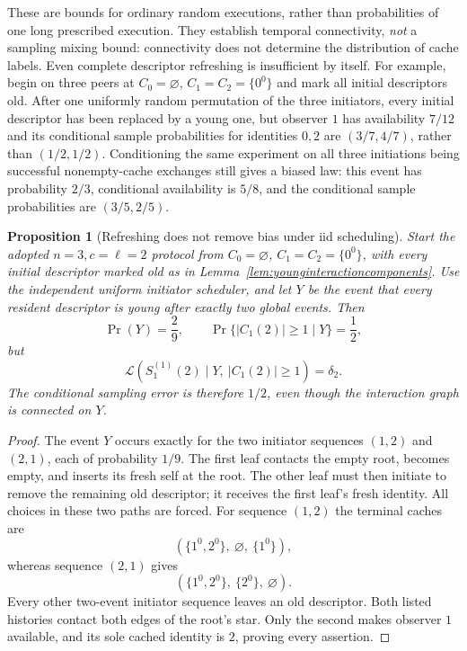 \documentclass[11pt]{article}
\newtheorem{proposition}[theorem]{Proposition}
\newcommand{\Law}{\mathcal L}
\begin{document}
These are bounds for ordinary random executions, rather than
probabilities of one long prescribed execution. They establish
temporal connectivity, \emph{not} a sampling mixing bound:
connectivity does not determine the distribution of cache labels.
Even complete descriptor refreshing is insufficient by itself.
For example, begin on three peers at
$C_0=\varnothing$, $C_1=C_2=\{0^0\}$ and mark all initial
descriptors old. After one uniformly random permutation of the
three initiators, every initial descriptor has been replaced by
a young one, but observer $1$ has availability $7/12$ and its
conditional sample probabilities for identities $0,2$ are
$(3/7,4/7)$, rather than $(1/2,1/2)$.
Conditioning the same experiment on all three initiations being
successful nonempty-cache exchanges still gives a biased law:
this event has probability $2/3$, conditional availability is
$5/8$, and the conditional sample probabilities are $(3/5,2/5)$.


\begin{proposition}[Refreshing does not remove bias under iid scheduling]
\label{prop:c2iidrefreshbias}
Start the adopted $n=3,c=\ell=2$ protocol from
$C_0=\varnothing$, $C_1=C_2=\{0^0\}$, with every initial
descriptor marked old as in Lemma~\ref{lem:younginteractioncomponents}.
Use the independent uniform initiator scheduler, and let $Y$ be
the event that every resident descriptor is young after exactly
two global events. Then
\[
 \Pr(Y)=\frac29,\qquad
 \Pr\{|C_1(2)|\ge1\mid Y\}=\frac12,
\]
but
\[
 \Law(S_1^{(1)}(2)\mid Y,\ |C_1(2)|\ge1)=\delta_2.
\]
The conditional sampling error is therefore $1/2$, even though
the interaction graph is connected on $Y$.
\end{proposition}
\begin{proof}
The event $Y$ occurs exactly for the two initiator sequences
$(1,2)$ and $(2,1)$, each of probability $1/9$. The first leaf
contacts the empty root, becomes empty, and inserts its fresh
self at the root. The other leaf must then initiate to remove
the remaining old descriptor; it receives the first leaf's
fresh identity. All choices in these two paths are forced.
For sequence $(1,2)$ the terminal caches are
\[
 (\{1^0,2^0\},\ \varnothing,\ \{1^0\}),
\]
whereas sequence $(2,1)$ gives
\[
 (\{1^0,2^0\},\ \{2^0\},\ \varnothing).
\]
Every other two-event initiator sequence leaves an old descriptor.
Both listed histories contact both edges of the root's star.
Only the second makes observer $1$ available, and its sole
cached identity is $2$, proving every assertion.
\end{proof}
\end{document}
